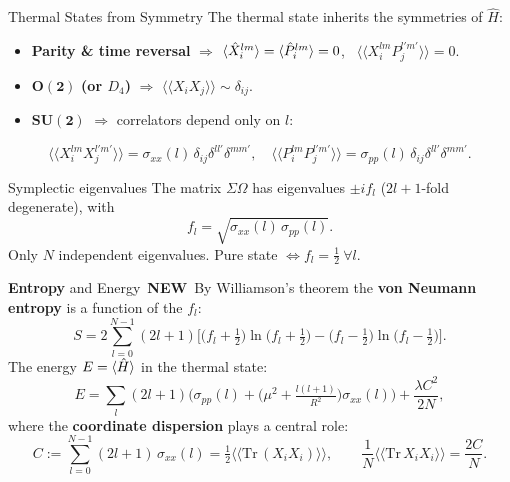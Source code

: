 \documentclass{beamer}
\newcommand{\hl}[1]{{\color{metured}\textbf{#1}}}
\newcommand{\new}[1]{{\color{metuaccent}\textbf{#1}}}
\newcommand{\newflag}{\hfill{\footnotesize\colorbox{metugold}{\color{white}\bfseries\,NEW\,}}}
\newcommand{\Tr}{\mathrm{Tr}\,}
\newcommand{\dbk}[1]{\langle\langle #1 \rangle\rangle}
\begin{document}
\begin{frame}{Thermal States from Symmetry}
  The thermal state inherits the symmetries of $\hat H$:
  \begin{itemize}
    \item \textbf{Parity \& time reversal} $\Rightarrow$
      $\braket{\hat X_i^{lm}}=\braket{\hat P_i^{lm}}=0$, \ $\dbk{X_i^{lm}P_j^{l'm'}}=0$.
    \item $\bm{O(2)}$ \textbf{(or $D_4$)} $\Rightarrow$ $\dbk{X_i X_j}\sim\delta_{ij}$.
    \item $\bm{SU(2)}$ $\Rightarrow$ correlators depend only on $l$:
  \end{itemize}
  \begin{equation*}
    \dbk{X_i^{lm}X_j^{l'm'}}=\sigma_{xx}(l)\,\delta_{ij}\delta^{ll'}\delta^{mm'}, \quad
    \dbk{P_i^{lm}P_j^{l'm'}}=\sigma_{pp}(l)\,\delta_{ij}\delta^{ll'}\delta^{mm'}.
  \end{equation*}
  \begin{block}{Symplectic eigenvalues}
    The matrix $\Sigma\Omega$ has eigenvalues $\pm i f_l$ ($2l+1$-fold degenerate), with
    \begin{equation*}
      f_l=\sqrt{\sigma_{xx}(l)\,\sigma_{pp}(l)}.
    \end{equation*}
    Only $N$ independent eigenvalues. Pure state $\Leftrightarrow f_l=\tfrac{1}{2}\ \forall l$.
  \end{block}
\end{frame}

\begin{frame}{\new{Entropy} and Energy \newflag}
  By Williamson's theorem the \hl{von Neumann entropy} is a function of the $f_l$:
  \begin{equation*}
    S = 2\sum_{l=0}^{N-1}(2l+1)\Big[\big(f_l+\tfrac{1}{2}\big)\ln\big(f_l+\tfrac{1}{2}\big)
      -\big(f_l-\tfrac{1}{2}\big)\ln\big(f_l-\tfrac{1}{2}\big)\Big].
  \end{equation*}
  The energy $E=\braket{\hat H}$ in the thermal state:
  \begin{equation*}
    E=\sum_{l}(2l+1)\Big(\sigma_{pp}(l)+\big(\mu^2+\tfrac{l(l+1)}{R^2}\big)\sigma_{xx}(l)\Big)+\frac{\lambda C^2}{2N},
  \end{equation*}
  where the \hl{coordinate dispersion} plays a central role:
  \begin{equation*}
    C:=\sum_{l=0}^{N-1}(2l+1)\,\sigma_{xx}(l)=\tfrac{1}{2}\dbk{\Tr(X_iX_i)}, \qquad
    \frac{1}{N}\dbk{\Tr X_iX_i}=\frac{2C}{N}.
  \end{equation*}
\end{frame}
\end{document}

